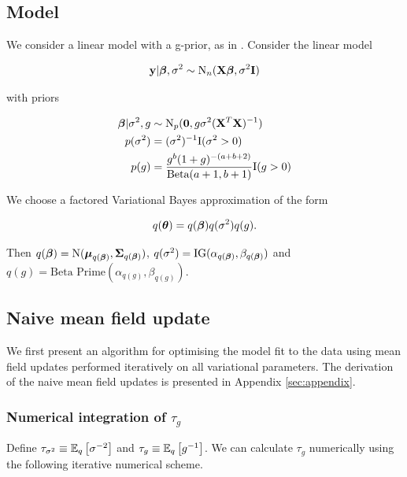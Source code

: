 \documentclass{amsart}[12pt]
\begin{document}
\subsection{Model}
\label{sec:model}

We consider a linear model with a g-prior, as in \cite{Liang2008}. Consider the linear model

\begin{align*}
	{\bf y} | {\boldsymbol \beta}, \sigma^2 \sim \text{N}_n({\bf X} {\boldsymbol \beta}, \sigma^2 {\bf I}) 
\end{align*}

with priors

\begin{align*}
	{\boldsymbol\beta} | \sigma^2, g & \sim \text{N}_p({\bf 0}, g \sigma^2 ({\bf X}^T {\bf X})^{-1})                     \\
	p(\sigma^2)          & = (\sigma^2)^{-1} \text{I}(\sigma^2 > 0)                                 \\
	p(g)                 & = \frac{g^b (1 + g)^{-(a + b + 2)}}{\text{Beta}(a + 1, b + 1)} \text{I}(g > 0) 
\end{align*}

We choose a factored Variational Bayes approximation of the form

\begin{align*}
	q({\boldsymbol \theta}) = q({\boldsymbol \beta}) q(\sigma^2) q(g). 
\end{align*}

Then $q({\boldsymbol \beta}) = \text{N}({\boldsymbol \mu}_{q({\boldsymbol \beta})}, {\boldsymbol \Sigma}_{q({\boldsymbol \beta})})$, $q(\sigma^2) = \text{IG}(\alpha_{q({\boldsymbol \beta})}, \beta_{q({\boldsymbol \beta})})$ and $q(g) = \text{Beta Prime}(\alpha_{q(g)}, \beta_{q(g)})$.

\subsection{Naive mean field update}
\label{sec:naive_mean_field_updates}

We first present an algorithm for optimising the model fit to the data using mean field updates performed
iteratively on all variational parameters. The derivation of the naive mean field updates is presented in
Appendix \ref{sec:appendix}.

\subsubsection{Numerical integration of $\tau_g$}
\label{sec:num_int}

Define $\tau_{\sigma^2} \equiv \mathbb{E}_q \left[ \sigma^{-2} \right]$ and $\tau_g \equiv \mathbb{E}_q \left[ g^{-1}
\right]$. We can calculate $\tau_g$ numerically using the following iterative numerical scheme.
\end{document}
